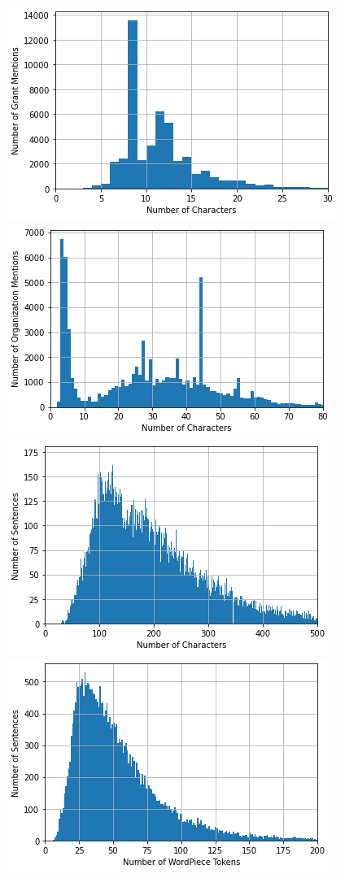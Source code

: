 \documentclass{report}
\theoremstyle{definition}
\theoremstyle{remark}
\begin{document}
\begin{figure}[h!]
    \centering
    \includegraphics[scale=0.45]{grant_lens.png}
    \includegraphics[scale=0.45]{org_lens.png}
    \includegraphics[scale=0.45]{sentence_lens.png}
    \includegraphics[scale=0.45]{sentence_tokens.png}

\end{figure}
\end{document}
